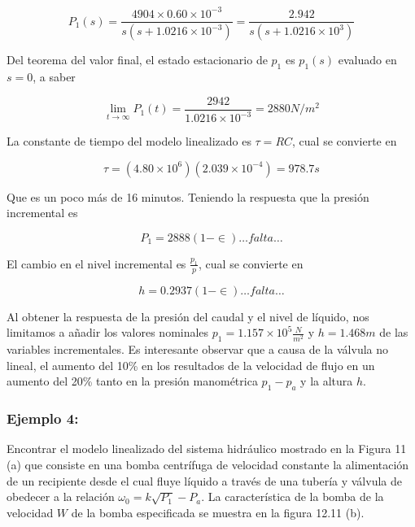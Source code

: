 \documentclass[a4paper,12pt,twoside]{proyectotanquesecci}
\begin{document}
\begin{equation}
P_{1}\left( s\right) =\frac {4904\times 0.60\times 10^{-3}}{s\left( s+1.0216\times 10^{-3}\right) }
=\frac {2.942}{s\left( s+1.0216\times 10^{3}\right) }
\end{equation}

Del teorema del valor final, el estado estacionario de $p_{1}$ es $p_{1}(s)$ evaluado en $s=0$, a saber

\begin{equation}
\lim _{t\rightarrow \infty }P_{1}\left( t\right) =\frac {2942}{1.0216\times 10^{-3}}=2880N/m^{2}
\end{equation}

La constante de tiempo del modelo linealizado es $\tau = RC$, cual se convierte en 

\begin{equation}
\tau =\left( 4.80\times 10^{6}\right) \left( 2.039\times 10^{-4}\right) =978.7s
\end{equation}

Que es un poco más de 16 minutos. Teniendo la respuesta que la presión incremental es

\begin{equation}
P_{1}=2888\left( 1-\in \right) \ldots falta\ldots
\end{equation}

El cambio en el nivel incremental es $\frac{p_{1}}{p}$, cual se convierte en 

\begin{equation}
h=0.2937\left( 1-\in \right) \ldots falta\ldots 
\end{equation}

Al obtener la respuesta de la presión del caudal y el nivel de líquido, nos limitamos a añadir los valores nominales $p_{1}=1.157\times 10^{5}\frac {N}{m^{2}}$ y $h=1.468m$ de las variables incrementales. Es interesante observar que a causa de la válvula no lineal, el aumento del 10\% en los resultados de la velocidad de flujo en un aumento del 20\% tanto en la presión manométrica $p_{1}-p_{a}$ y la altura $h$. \\

\subsubsection{Ejemplo 4:}

Encontrar el modelo linealizado del sistema hidráulico mostrado en la Figura 11 (a) que consiste en una bomba centrífuga de velocidad constante la alimentación de un recipiente desde el cual fluye líquido a través de una tubería y válvula de obedecer a la relación $\omega _{0}=k\sqrt {P_{1}}-P_{a}$. La característica de la bomba de la velocidad $W$ de la bomba especificada se muestra en la figura 12.11 (b). \\
\end{document}

